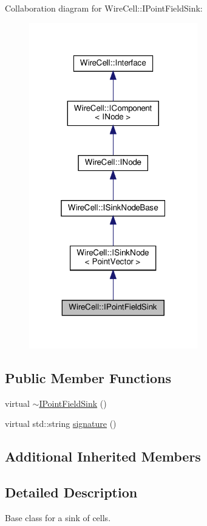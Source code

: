 Collaboration diagram for Wire\+Cell\+:\+:I\+Point\+Field\+Sink\+:
\nopagebreak
\begin{figure}[H]
\begin{center}
\leavevmode
\includegraphics[width=208pt]{class_wire_cell_1_1_i_point_field_sink__coll__graph}
\end{center}
\end{figure}
\subsection*{Public Member Functions}
\begin{DoxyCompactItemize}
\item 
virtual \hyperlink{class_wire_cell_1_1_i_point_field_sink_a6d591b284e3a59b792e19d114aceeae1}{$\sim$\+I\+Point\+Field\+Sink} ()
\item 
virtual std\+::string \hyperlink{class_wire_cell_1_1_i_point_field_sink_a1f9b71af0582532c6ca6fce638280550}{signature} ()
\end{DoxyCompactItemize}
\subsection*{Additional Inherited Members}


\subsection{Detailed Description}
Base class for a sink of cells. 

